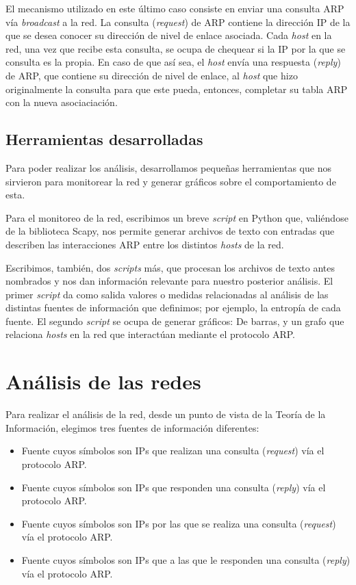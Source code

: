 \documentclass{article}
\begin{document}
El mecanismo utilizado en este último caso consiste en enviar una consulta ARP
vía \emph{broadcast} a la red. La consulta (\emph{request}) de ARP contiene la
dirección IP de la que se desea conocer su dirección de nivel de enlace
asociada. Cada \emph{host} en la red, una vez que recibe esta consulta, se
ocupa de chequear si la IP por la que se consulta es la propia. En caso de que
así sea, el \emph{host} envía una respuesta (\emph{reply}) de ARP, que
contiene su dirección de nivel de enlace, al \emph{host} que hizo
originalmente la consulta para que este pueda, entonces, completar su tabla
ARP con la nueva asociaciación.

\subsection{Herramientas desarrolladas}
Para poder realizar los análisis, desarrollamos pequeñas herramientas que nos
sirvieron para monitorear la red y generar gráficos sobre el comportamiento de
esta.

Para el monitoreo de la red, escribimos un breve \emph{script} en Python que,
valiéndose de la biblioteca Scapy, nos permite generar archivos de texto con
entradas que describen las interacciones ARP entre los distintos \emph{hosts}
de la red.

Escribimos, también, dos \emph{scripts} más, que procesan los archivos de texto
antes nombrados y nos dan información relevante para nuestro posterior
análisis. El primer \emph{script} da como salida valores o medidas
relacionadas al análisis de las distintas fuentes de información que
definimos; por ejemplo, la entropía de cada fuente. El segundo \emph{script}
se ocupa de generar gráficos: De barras, y un grafo que relaciona \emph{hosts}
en la red que interactúan mediante el protocolo ARP.


\section{Análisis de las redes}
Para realizar el análisis de la red, desde un punto de vista de la Teoría de
la Información, elegimos tres fuentes de información diferentes:

\begin{itemize}
    \item Fuente cuyos símbolos son IPs que realizan una consulta
        (\emph{request}) vía el protocolo ARP.
    \item Fuente cuyos símbolos son IPs que responden una consulta
        (\emph{reply}) vía el protocolo ARP.
    \item Fuente cuyos símbolos son IPs por las que se realiza una consulta
        (\emph{request}) vía el protocolo ARP.
    \item Fuente cuyos símbolos son IPs que a las que le responden una
        consulta (\emph{reply}) vía el protocolo ARP.
\end{itemize}
\end{document}
